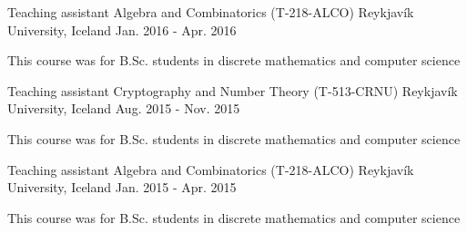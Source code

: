 \begin{cventries}

  \cventry
    {Teaching assistant} %
    {Algebra and Combinatorics (T-218-ALCO)} %
    {Reykjavík University, Iceland} %
    {Jan. 2016 - Apr. 2016} %
    {
      \begin{cvitems} %
        \item {This course was for B.Sc. students in discrete mathematics and computer science}
      \end{cvitems}
    }


  \cventry
    {Teaching assistant} %
    {Cryptography and Number Theory (T-513-CRNU)} %
    {Reykjavík University, Iceland} %
    {Aug. 2015 - Nov. 2015} %
    {
      \begin{cvitems} %
        \item {This course was for B.Sc. students in discrete mathematics and computer science}
      \end{cvitems}
    }


\cventry
  {Teaching assistant} %
  {Algebra and Combinatorics (T-218-ALCO)} %
  {Reykjavík University, Iceland} %
  {Jan. 2015 - Apr. 2015} %
  {
    \begin{cvitems} %
      \item {This course was for B.Sc. students in discrete mathematics and computer science}
    \end{cvitems}
  }


\end{cventries}
